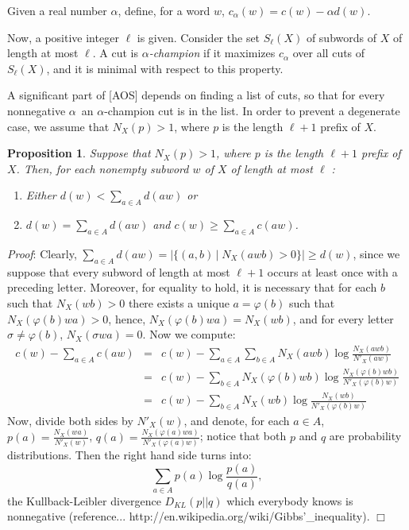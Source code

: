 \documentclass[12pt]{article}
\newenvironment{proof}{
  {\noindent\em Proof\/}:}{\hfill$\Box$\vspace{3 mm}}
\newtheorem{pro}[lem]{Proposition}
\newcommand{\conj}[2]{\ensuremath{\{#1\,|\;#2\}}}
\newcommand{\al}{\ensuremath{\alpha}\xspace}
\begin{document}
Given a real number \al, define, for a word \(w\), \(c_\al(w)=c(w)-\al d(w)\).

Now, a positive integer \(\ell\) is given.  Consider the set \(S_\ell(X)\) of
subwords of \(X\) of length at most \(\ell\).  A cut is \emph{\al-champion} if
it maximizes \(c_\al\) over all cuts of \(S_\ell(X)\), and it is minimal with
respect to this property.

A significant part of [AOS] depends on finding a list of cuts, so that for
every nonnegative \al\ an \al-champion cut is in the list.  In order to
prevent a degenerate case, we assume that \(N_X(p)>1\), where \(p\) is the
length \(\ell+1\) prefix of \(X\).

\begin{pro}\label{tau-good}
  Suppose that \(N_X(p)>1\), where \(p\) is the length \(\ell+1\)
  prefix of \(X\).  Then, for each nonempty subword \(w\) of \(X\) of length
  at most \(\ell\) :
  \begin{enumerate}
      \item Either \(d(w) < \sum_{a\in A}d(aw)\) or
      \item \(d(w) = \sum_{a\in A}d(aw)\) and \(c(w) \geq
    \sum_{a\in A}c(aw)\).
  \end{enumerate}
\end{pro}
\begin{proof}
  Clearly, \(\sum_{a\in A}d(aw)=|\conj{(a,b)}{N_X(awb)>0}|\geq d(w)\), since
  we suppose that every subword of length at most \(\ell+1\) occurs at least
  once with a preceding letter.  Moreover, for equality to hold, it is
  necessary that for each \(b\) such that \(N_X(wb)>0\) there exists a unique
  \(a=\varphi(b)\) such that \(N_X(\varphi(b)wa)>0\), hence,
  \(N_X(\varphi(b)wa)=N_X(wb)\), and for every letter
  \(\sigma\not=\varphi(b)\), \(N_X(\sigma wa)=0\).  Now we compute:
  \begin{eqnarray*}
    c(w) - \sum_{a\in A}c(aw)&=& c(w) -
    \sum_{a\in A}\sum_{b\in A}N_X(awb)\log\frac{N_X(awb)}{N'_X(aw)}\\
    &=& c(w) -
    \sum_{b\in A}N_X(\varphi(b)wb)\log\frac{N_X(\varphi(b)wb)}{N'_X(\varphi(b)w)}\\
    &=& c(w) -
    \sum_{b\in A}N_X(wb)\log\frac{N_X(wb)}{N'_X(\varphi(b)w)}
  \end{eqnarray*}
  Now, divide both sides by \(N'_X(w)\), and denote, for each \(a\in A\),
  \(p(a)=\frac{N_X(wa)}{N'_X(w)}\),
  \(q(a)=\frac{N_X(\varphi(a)wa)}{N'_X(\varphi(a)w)}\); notice that both \(p\)
  and \(q\) are probability distributions.  Then the right hand side turns
  into:
  \[
  \sum_{a\in A}p(a)\log\frac{p(a)}{q(a)},
  \]
  the Kullback-Leibler divergence \(D_{KL}(p||q)\) which everybody knows is
  nonnegative (reference... http://en.wikipedia.org/wiki/Gibbs'\_inequality).
\end{proof}
\end{document}
